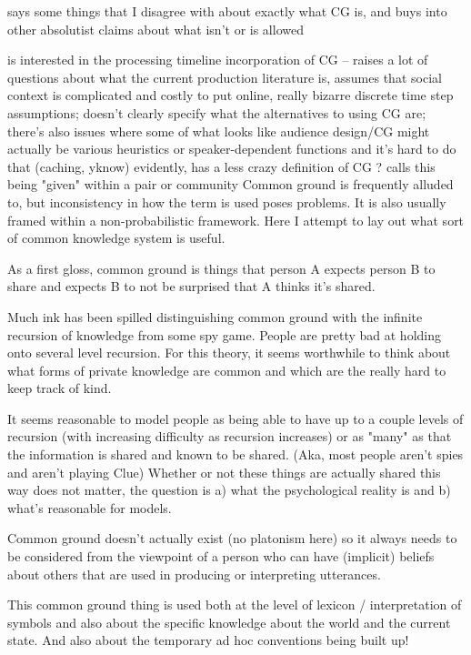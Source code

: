 \documentclass[]{article}
\begin{document}
\cite{horton1996} says some things that I disagree with about exactly what CG is, and buys into other absolutist claims about what isn't or is allowed

\cite{horton1996} is interested in the processing timeline incorporation of CG -- raises a lot of questions about what the current production literature is, assumes that social context is complicated and costly to put online, really bizarre discrete time step assumptions; doesn't clearly specify what the alternatives to using CG are; there's also issues where some of what looks like audience design/CG might actually be various heuristics or speaker-dependent functions and it's hard to do that (caching, yknow) 
evidently, \cite{hanna2003} has a less crazy definition of CG ? 
\cite{fay2010} calls this being "given" within a pair or community 
Common ground is frequently alluded to, but inconsistency in how the term is used poses problems. It is also usually framed within a non-probabilistic framework. Here I attempt to lay out what sort of common knowledge system is useful. 

As a first gloss, common ground is things that person A expects person B to share and expects B to not be surprised that A thinks it's shared. 

Much ink has been spilled distinguishing common ground with the infinite recursion of knowledge from some spy game. People are pretty bad at holding onto several level recursion. For this theory, it seems worthwhile to think about what forms of private knowledge are common and which are the really hard to keep track of kind. 

It seems reasonable to model people as being able to have up to a couple levels of recursion (with increasing difficulty as recursion increases) or as "many" as that the information is shared and known to be shared. (Aka, most people aren't spies and aren't playing Clue) Whether or not these things are actually shared this way does not matter, the question is a) what the psychological reality is and b) what's reasonable for models. 

Common ground doesn't actually exist (no platonism here) so it always needs to be considered from the viewpoint of a person who can have (implicit) beliefs about others that are used in producing or interpreting utterances. 

This common ground thing is used both at the level of lexicon / interpretation of symbols and also about the specific knowledge about the world and the current state. And also about the temporary ad hoc conventions being built up! 
\end{document}
